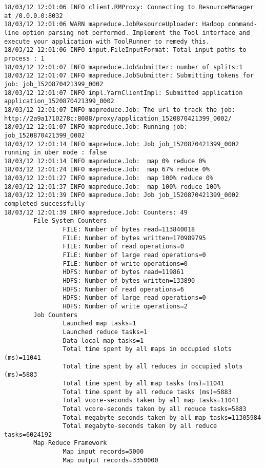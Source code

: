 \begin{lstlisting}
18/03/12 12:01:06 INFO client.RMProxy: Connecting to ResourceManager at /0.0.0.0:8032
18/03/12 12:01:06 WARN mapreduce.JobResourceUploader: Hadoop command-line option parsing not performed. Implement the Tool interface and execute your application with ToolRunner to remedy this.
18/03/12 12:01:06 INFO input.FileInputFormat: Total input paths to process : 1
18/03/12 12:01:07 INFO mapreduce.JobSubmitter: number of splits:1
18/03/12 12:01:07 INFO mapreduce.JobSubmitter: Submitting tokens for job: job_1520870421399_0002
18/03/12 12:01:07 INFO impl.YarnClientImpl: Submitted application application_1520870421399_0002
18/03/12 12:01:07 INFO mapreduce.Job: The url to track the job: http://2a9a1710278c:8088/proxy/application_1520870421399_0002/
18/03/12 12:01:07 INFO mapreduce.Job: Running job: job_1520870421399_0002
18/03/12 12:01:14 INFO mapreduce.Job: Job job_1520870421399_0002 running in uber mode : false
18/03/12 12:01:14 INFO mapreduce.Job:  map 0% reduce 0%
18/03/12 12:01:24 INFO mapreduce.Job:  map 67% reduce 0%
18/03/12 12:01:27 INFO mapreduce.Job:  map 100% reduce 0%
18/03/12 12:01:37 INFO mapreduce.Job:  map 100% reduce 100%
18/03/12 12:01:39 INFO mapreduce.Job: Job job_1520870421399_0002 completed successfully
18/03/12 12:01:39 INFO mapreduce.Job: Counters: 49
        File System Counters
                FILE: Number of bytes read=113840018
                FILE: Number of bytes written=170989795
                FILE: Number of read operations=0
                FILE: Number of large read operations=0
                FILE: Number of write operations=0
                HDFS: Number of bytes read=119861
                HDFS: Number of bytes written=133890
                HDFS: Number of read operations=6
                HDFS: Number of large read operations=0
                HDFS: Number of write operations=2
        Job Counters
                Launched map tasks=1
                Launched reduce tasks=1
                Data-local map tasks=1
                Total time spent by all maps in occupied slots (ms)=11041
                Total time spent by all reduces in occupied slots (ms)=5883
                Total time spent by all map tasks (ms)=11041
                Total time spent by all reduce tasks (ms)=5883
                Total vcore-seconds taken by all map tasks=11041
                Total vcore-seconds taken by all reduce tasks=5883
                Total megabyte-seconds taken by all map tasks=11305984
                Total megabyte-seconds taken by all reduce tasks=6024192
        Map-Reduce Framework
                Map input records=5000
                Map output records=3350000

\end{lstlisting}
